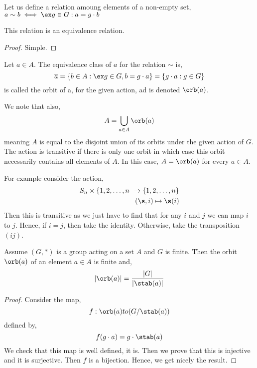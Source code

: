 \noindent
Let us define a relation amoung elements of a non-empty set, $a \sim b \iff \ex g \in G : a = g \cdot b$
\begin{nprop}
   This relation is an equivalence relation.
\end{nprop}
\begin{proof}
  Simple.
\end{proof}

\begin{ndefi}[Orbit]
  Let $a \in A$. The equivalence class of $a$ for the relation $\sim$ is,
  $$ \overline a = \{b \in A : \ex g \in G, b = g \cdot a\} = \{g \cdot a : g \in G\} $$
  is called the orbit of a, for the given action, ad is denoted $\orb (a)$.
\end{ndefi}
We note that also,
$$ A = \bigcup_{a \in A} \orb (a) $$
meaning $A$ is equal to the disjoint union of its orbits under the given action of $G$. \\
The action is transitive if there is only one orbit in which case this orbit necessarily contains all elements of $A$. In this case, $A = \orb (a)$ for every $a \in A$.

\begin{eg}
  For example consider the action,
  \begin{align*}
    S_n \times \{1, 2, \dots, n\ \to \{1, 2, \dots, n \}\\
    (\s, i) \mapsto \s(i)
  \end{align*}
  Then this is transitive as we just have to find that for any $i$ and $j$ we can map $i$ to $j$. Hence, if $i = j$, then take the identity. Otherwise, take the transposition $(ij)$.
\end{eg}

\begin{nthm}
  Assume $(G, *)$ is a group acting on a set $A$ and $G$ is finite. Then the orbit $\orb (a)$ of an element $a \in A$ is finite and,
  $$ |\orb (a)| = \frac{|G|}{|\stab(a)|} $$
\end{nthm}
\begin{proof}
  Consider the map,
  $$ f: \orb(a) to (G / \stab(a)) $$
  defined by,
  $$ f(g \cdot a) = g \cdot \stab (a) $$
  We check that this map is well defined, it is. Then we prove that this is injective and it is surjective. Then $f$ is a bijection. Hence, we get nicely the result.
\end{proof}
